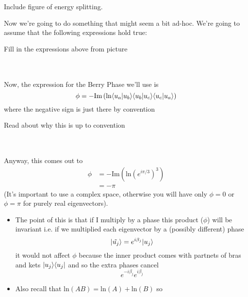 \documentclass[11pt]{article}
\begin{document}
\begin{center}
  Include figure of energy splitting.
\end{center} Now we're going to do something that might seem a bit ad-hoc. We're going to assume that the following expressions hold true: 

\begin{note}
  {Fill in the expressions above from picture}
\end{note}
\\
\\
Now, the expression for the Berry Phase we'll use is 
$$ \phi = - \mathrm{Im} \left( \mathrm{ln} \langle u_a | u_b \rangle \langle u_b | u_c \rangle \langle u_c | u_a \rangle \right) $$ where the negative sign is just there by convention \begin{note}
{Read about why this is up to convention}
\end{note} 
\\
\\
Anyway, this comes out to 
\begin{align*}
  \phi &= -\mathrm{Im} \left( \mathrm{ln} \left(e^{i\pi/3}\right)^3 \right) \\
  &= -\pi
\end{align*} (It's important to use a complex space, otherwise you will have only $\phi = 0$ or $\phi = \pi$ for purely real eigenvectors).

\begin{itemize}
  \item The point of this is that if I multiply by a phase this product ($\phi$) will be invariant i.e. if we multiplied each eigenvector by a (possibly different) phase $$ \lvert\tilde{u_j}\rangle = e^{i\beta_j} \lvert u_j\rangle $$ it would not affect $\phi$ because the inner product comes with partnets of bras and kets $\lvert u_j\rangle\langle u_j\rvert$ and so the extra phases cancel $$ e^{-i\beta_j} e^{i\beta_j} $$
  
  \item Also recall that $\mathrm{ln}(AB) = \mathrm{ln}(A) + \mathrm{ln}(B)$ so 
\end{itemize}
\end{document}
